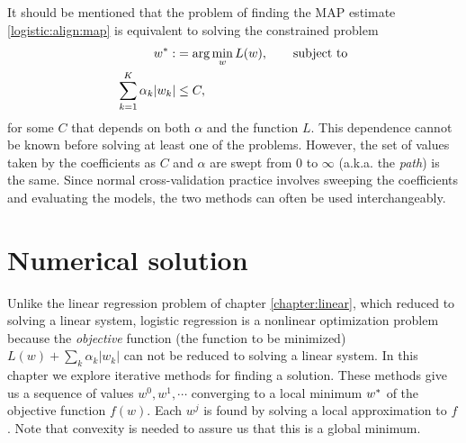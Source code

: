 It should be mentioned that the problem of finding the MAP estimate \eqref{logistic:align:map} is equivalent to solving the constrained problem
\begin{align*}
  {w^\ast} :&= \arg\min_w L(w),\qquad\mbox{subject to}\\
  \sum_{k=1}^K\alpha_k|w_k| &\leq C,
\end{align*}
for some $C$ that depends on both $\alpha$ and the function $L$.  This dependence cannot be known before solving at least one of the problems.  However, the set of values taken by the coefficients as $C$ and $\alpha$ are swept from 0 to $\infty$ (a.k.a. the \emph{path}) is the same.  Since normal cross-validation practice involves sweeping the coefficients and evaluating the models, the two methods can often be used interchangeably.

\section{Numerical solution}
\label{logistic:section:numerical}
Unlike the linear regression problem of chapter \ref{chapter:linear}, which reduced to solving a linear system, logistic regression is a nonlinear optimization problem because the \emph{objective} function (the function to be minimized) $L(w) + \sum_k\alpha_k|w_k|$ can not be reduced to solving a linear system.  In this chapter we explore iterative methods for finding a solution.  These methods give us a sequence of values $w^0,w^1,\cdots$ converging to a local minimum ${w^\ast}$ of the objective function $f(w)$.  Each $w^j$ is found by solving a local approximation to $f$.  Note that convexity is needed to assure us that this is a global minimum.

